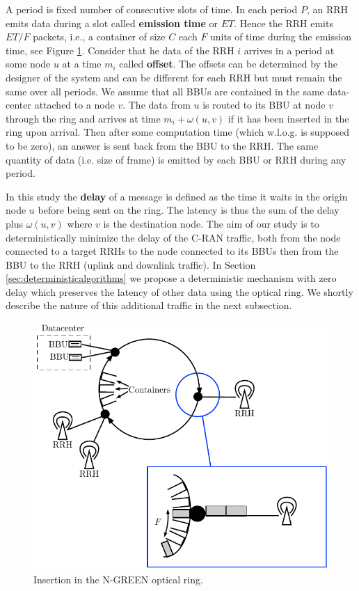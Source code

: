 \documentclass[10pt, conference, letterpaper]{IEEEtran}
\begin{document}
A period is fixed number of consecutive slots of time.  In each period $P$, an RRH emits data during a slot called \textbf{emission time} or $ET$. Hence the RRH emits $ET / F$ packets, i.e., a container of size $C$ each $F$ units of time during the emission time, see Figure \ref{fig:interface}. Consider that he data of the RRH $i$ arrives in a period at some node $u$ at a time $m_i$  called {\bf offset}. The offsets can be determined  by the designer of the system and can be different for each RRH but must remain the same over all periods. We assume that all BBUs are contained in the same data-center attached to a node $v$. The data from $u$ is routed to its BBU at node $v$ through the ring and arrives at time $m_i + \omega(u,v)$ if it has been inserted in the ring upon arrival. Then after some computation time (which w.l.o.g. is supposed to be zero), an answer is sent back from the BBU to the RRH. The same quantity of data (i.e. size of frame) is emitted by each BBU or RRH during any period.

   In this study the {\bf delay} of a message is defined as the time it waits in the origin node $u$   before being sent on the ring. The latency is thus the sum of the delay plus $\omega(u,v) $  where $v$ is the destination node.
   The aim of our study is to deterministically minimize the delay of the C-RAN traffic, both from the node connected to a target RRHs to the node connected to its  BBUs then from the BBU to the RRH (uplink and downlink traffic).
   In Section \ref{sec:deterministicalgorithms} we propose a deterministic mechanism with zero delay which preserves the latency of other data using the optical ring. We shortly describe the nature of this additional traffic in the next subsection.


\begin{figure}[h!]
\begin{center}

      \includegraphics[scale=0.7]{interface.pdf}
     \caption{Insertion in the N-GREEN optical ring.}\label{fig:interface}

\end{center}
  \end{figure}
\end{document}
